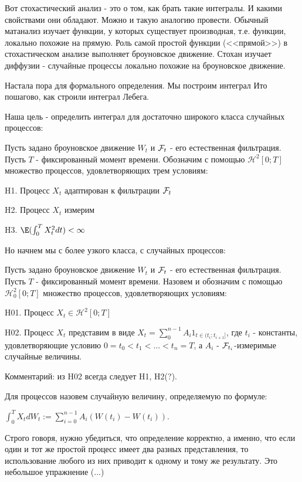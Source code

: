 {Вот стохастический анализ - это о том, как брать такие интегралы. И какими свойствами они обладают. Можно и такую аналогию провести. Обычный матанализ изучает функции, у которых существует производная, т.е. функции, локально похожие на прямую. Роль самой простой функции (<<прямой>>) в стохастическом анализе выполняет броуновское движение. Стохан изучает диффузии - случайные процессы локально похожие на броуновское движение.


Настала пора для формального определения. Мы построим интеграл Ито пошагово, как строили интеграл Лебега.

Наша цель - определить интеграл для достаточно широкого класса случайных процессов:

\begin{mydef} Пусть задано броуновское движение $W_{t}$ и $\mathcal{F}_{t}$ - его естественная фильтрация. Пусть $T$ - фиксированный момент времени. Обозначим с помощью $\mathcal{H}^{2}[0;T]$ множество процессов, удовлетворяющих трем условиям:

H1. Процесс $X_{t}$ адаптирован к фильтрации $\mathcal{F}_{t}$

H2. Процесс $X_{t}$ измерим

H3. $\E(\int_{0}^{T}X_{t}^{2}dt)<\infty$
\end{mydef}
Но начнем мы с более узкого класса, с  случайных процессов:

\begin{mydef} Пусть задано броуновское движение $W_{t}$ и $\mathcal{F}_{t}$ - его естественная фильтрация. Пусть $T$ - фиксированный момент времени. Назовем  и обозначим с помощью $\mathcal{H}_{0}^{2}[0;T]$ множество процессов, удовлетворяющих условиям:

H01. Процесс $X_{t}\in\mathcal{H}^{2}[0;T]$

H02. Процесс $X_{t}$ представим в виде $X_{t}=\sum_{0}^{n-1}A_{i}1_{t\in(t_{i};t_{i+1}]}$, где $t_{i}$ - константы, удовлетворяющие условию $0=t_{0}<t_{1}<...<t_{n}=T$, а $A_{i}$ - $\mathcal{F}_{t_{i}}$-измеримые случайные величины.
\end{mydef}
\begin{myex} 
\end{myex}


Комментарий: из H02 всегда следует H1, H2(?).

\begin{mydef} Для  процессов назовем  случайную величину, определяемую по формуле:

$\int_{0}^{T}X_{t}dW_{t}:=\sum_{i=0}^{n-1}A_{i}(W(t_{i})-W(t_{i}))$.
\end{mydef}
Строго говоря, нужно убедиться, что определение корректно, а именно, что если один и тот же простой процесс имеет два разных представления, то использование любого из них приводит к одному и тому же результату. Это небольшое упражнение (...)

}

